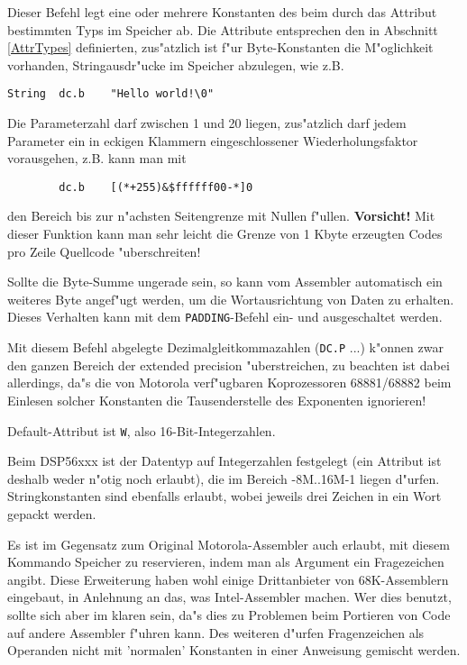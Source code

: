 \documentclass[12pt,a4paper,twoside]{report}
\newcommand{\bb}[1]{{\bf #1}}
\newcommand{\tty}[1]{{\tt #1}}
\begin{document}
Dieser Befehl legt eine oder mehrere Konstanten des beim durch
das Attribut bestimmten Typs im Speicher ab.  Die Attribute entsprechen
den in Abschnitt \ref{AttrTypes} definierten, zus"atzlich ist f"ur
Byte-Konstanten die M"oglichkeit vorhanden, Stringausdr"ucke im Speicher
abzulegen, wie z.B.
\begin{verbatim}
String  dc.b    "Hello world!\0"
\end{verbatim}
Die Parameterzahl darf zwischen 1 und 20 liegen, zus"atzlich darf jedem
Parameter ein in eckigen Klammern eingeschlossener Wiederholungsfaktor
vorausgehen, z.B. kann man mit
\begin{verbatim}
        dc.b    [(*+255)&$ffffff00-*]0
\end{verbatim}
den Bereich bis zur n"achsten Seitengrenze mit Nullen f"ullen.
\bb{Vorsicht!}
Mit dieser Funktion kann man sehr leicht die Grenze von 1 Kbyte erzeugten
Codes pro Zeile Quellcode "uberschreiten!
\par
Sollte die Byte-Summe ungerade sein, so kann vom Assembler automatisch
ein weiteres Byte angef"ugt werden, um die Wortausrichtung von Daten zu
erhalten.  Dieses Verhalten kann mit dem \tty{PADDING}-Befehl ein-
und ausgeschaltet werden.
\par
Mit diesem Befehl abgelegte Dezimalgleitkommazahlen (\tty{DC.P} ...) k"onnen
zwar den ganzen Bereich der extended precision "uberstreichen, zu beachten
ist dabei allerdings, da"s die von Motorola verf"ugbaren Koprozessoren
68881/68882 beim Einlesen solcher Konstanten die Tausenderstelle des
Exponenten ignorieren!
\par
Default-Attribut ist \tty{W}, also 16-Bit-Integerzahlen.
\par
Beim DSP56xxx ist der Datentyp auf Integerzahlen festgelegt (ein
Attribut ist deshalb weder n"otig noch erlaubt), die im Bereich
-8M..16M-1 liegen d"urfen.   Stringkonstanten sind ebenfalls erlaubt,
wobei jeweils drei Zeichen in ein Wort gepackt werden.
\par
Es ist im Gegensatz zum Original Motorola-Assembler auch erlaubt, mit
diesem Kommando Speicher zu reservieren, indem man als Argument ein
Fragezeichen angibt.  Diese Erweiterung haben wohl einige Drittanbieter
von 68K-Assemblern eingebaut, in Anlehnung an das, was Intel-Assembler
machen.  Wer dies benutzt, sollte sich aber im klaren sein, da"s dies
zu Problemen beim Portieren von Code auf andere Assembler f"uhren kann.
Des weiteren d"urfen Fragenzeichen als Operanden nicht mit 'normalen'
Konstanten in einer Anweisung gemischt werden.
\end{document}
